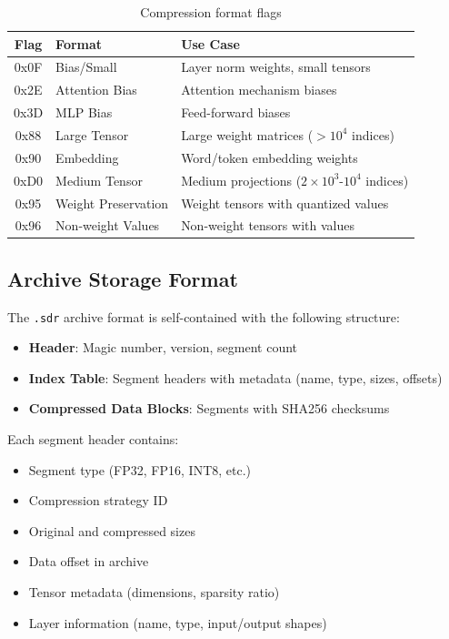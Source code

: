 \documentclass[11pt]{article}
\begin{document}
\begin{table}[h]
\centering
\small
\begin{tabular}{cll}
\toprule
Flag & Format & Use Case \\
\midrule
0x0F & Bias/Small & Layer norm weights, small tensors \\
0x2E & Attention Bias & Attention mechanism biases \\
0x3D & MLP Bias & Feed-forward biases \\
0x88 & Large Tensor & Large weight matrices ($>10^4$ indices) \\
0x90 & Embedding & Word/token embedding weights \\
0xD0 & Medium Tensor & Medium projections ($2 \times 10^3$-$10^4$ indices) \\
0x95 & Weight Preservation & Weight tensors with quantized values \\
0x96 & Non-weight Values & Non-weight tensors with values \\
\bottomrule
\end{tabular}
\caption{Compression format flags}
\label{tab:formats}
\end{table}

\subsection{Archive Storage Format}

The \texttt{.sdr} archive format is self-contained with the following structure:

\begin{itemize}
    \item \textbf{Header}: Magic number, version, segment count
    \item \textbf{Index Table}: Segment headers with metadata (name, type, sizes, offsets)
    \item \textbf{Compressed Data Blocks}: Segments with SHA256 checksums
\end{itemize}

Each segment header contains:
\begin{itemize}
    \item Segment type (FP32, FP16, INT8, etc.)
    \item Compression strategy ID
    \item Original and compressed sizes
    \item Data offset in archive
    \item Tensor metadata (dimensions, sparsity ratio)
    \item Layer information (name, type, input/output shapes)
\end{itemize}
\end{document}
